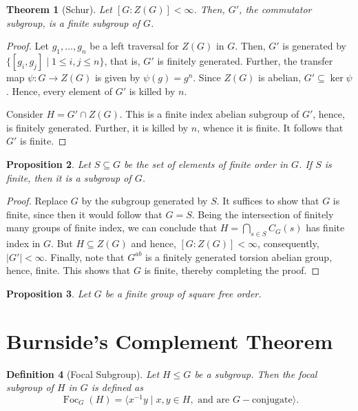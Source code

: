 \documentclass[12pt]{article}
\theoremstyle{thmstyle}
\newtheorem{theorem}{Theorem}[section]
\newtheorem{proposition}[theorem]{Proposition}
\theoremstyle{defstyle}
\newtheorem{definition}[theorem]{Definition}
\renewcommand{\le}{\leqslant}
\begin{document}
\begin{theorem}[Schur]
    Let $[G: Z(G)] < \infty$. Then, $G'$, the commutator subgroup, is a finite subgroup of $G$.
\end{theorem}
\begin{proof}
    Let $g_1,\dots,g_n$ be a left traversal for $Z(G)$ in $G$. Then, $G'$ is generated by $\{[g_i, g_j]\mid 1\le i, j\le n\}$, that is, $G'$ is finitely generated. Further, the transfer map $\psi: G\to Z(G)$ is given by $\psi(g) = g^n$. Since $Z(G)$ is abelian, $G'\subseteq\ker\psi$. Hence, every element of $G'$ is killed by $n$.

    Consider $H = G'\cap Z(G)$. This is a finite index abelian subgroup of $G'$, hence, is finitely generated. Further, it is killed by $n$, whence it is finite. It follows that $G'$ is finite.
\end{proof}

\begin{proposition}
    Let $S\subseteq G$ be the set of elements of finite order in $G$. If $S$ is finite, then it is a subgroup of $G$.
\end{proposition}
\begin{proof}
    Replace $G$ by the subgroup generated by $S$. It suffices to show that $G$ is finite, since then it would follow that $G = S$. Being the intersection of finitely many groups of finite index, we can conclude that $H = \bigcap_{s\in S} C_G(s)$ has finite index in $G$. But $H\subseteq Z(G)$ and hence, $[G:Z(G)] < \infty$, consequently, $|G'| < \infty$. Finally, note that $G^{ab}$ is a finitely generated torsion abelian group, hence, finite. This shows that $G$ is finite, thereby completing the proof.
\end{proof}

\begin{proposition}
    Let $G$ be a finite group of square free order. 
\end{proposition}

\section{Burnside's Complement Theorem}

\begin{definition}[Focal Subgroup]
    Let $H\le G$ be a subgroup. Then the \emph{focal subgroup} of $H$ in $G$ is defined as 
    \begin{equation*}
        \operatorname{Foc}_G(H) = \langle x^{-1}y\mid x,y\in H,\text{ and are }G-\text{conjugate}\rangle.
    \end{equation*}
\end{definition}
\end{document}
